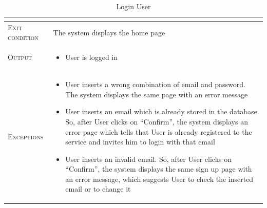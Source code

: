 \begin{table}[H]
\begin{tabular}[c]{|l|p{}|}
\begin{itemize}
                                        \end{itemize}\\
        \hline %
        \textsc{Exit condition}    &  The system displays the home page\\
    	\hline %
    	\textsc{Output}             & 
    	\begin{itemize}
    	    \item User is logged in
    	\end{itemize}\\
    	\hline %
    	\textsc{Exceptions}         &  \begin{itemize}
    	    \item User inserts a wrong combination of email and password. The system displays the same page with an error message
    	    \item User inserts an email which is already stored in the database. So, after User clicks on “Confirm”, the system displays an error page which tells that User is already registered to the service and invites him to login with that email
            \item User inserts an invalid email. So, after User clicks on “Confirm”, the system displays the same sign up page with an error message, which suggests User to check the inserted email or to change it

    	\end{itemize}\\
    	\hline %
        
    \end{tabular}

 

    
    \caption{\label{tab:user_login}Login User}
\end{table}

